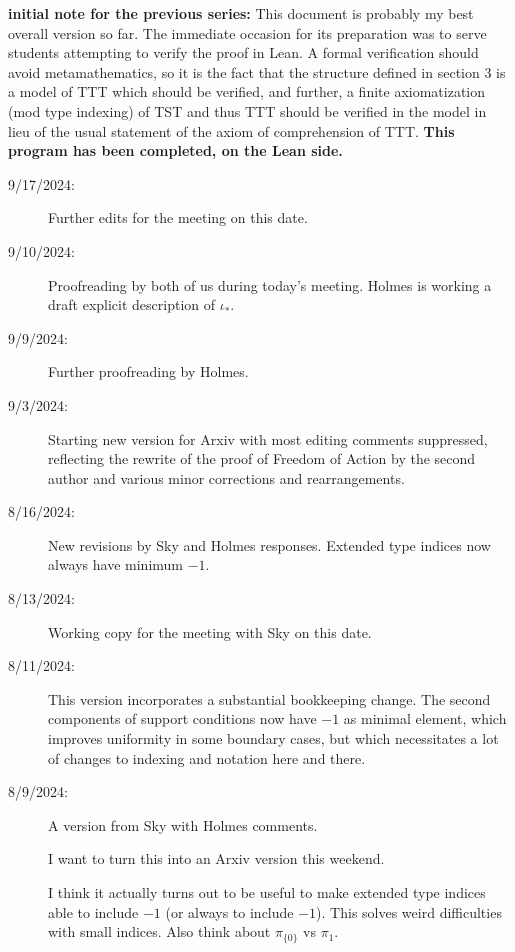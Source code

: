 \documentclass[112pt]{article}
\theoremstyle{definition}
\theoremstyle{remark}
\begin{document}
{\bf initial note for the previous series:}  This document is probably my best overall version so far.  The immediate occasion for its preparation was to serve students attempting to verify the proof in Lean.  A formal verification should avoid metamathematics, so it is the fact that the structure defined in section 3 is a model of TTT which should be verified, and further, a finite axiomatization (mod type indexing) of TST and thus TTT should be verified in the model in lieu of the usual statement of the axiom of comprehension of TTT.  {\bf This program has been completed, on the Lean side.}
\begin{description}

\item[9/17/2024:]  Further edits for the meeting on this date.

\item[9/10/2024:]  Proofreading by both of us during today's meeting.  Holmes is working a draft explicit description of $\iota_*$.

\item[9/9/2024:]  Further proofreading by Holmes.

\item[9/3/2024:]  Starting new version for Arxiv with most editing comments suppressed, reflecting the rewrite of the proof of Freedom of Action by the second author and various minor corrections and rearrangements.

\item[8/16/2024:]  New revisions by Sky and Holmes responses.  Extended type indices now always have minimum $-1$.

\item[8/13/2024:]  Working copy for the meeting with Sky on this date.

\item[8/11/2024:]  This version incorporates a substantial bookkeeping change.  The second components of support conditions now have $-1$ as minimal element, which improves uniformity in some boundary cases, but which necessitates a lot of changes to indexing and notation here and there.

\item[8/9/2024:]  A version from Sky with Holmes comments.

I want to turn this into an Arxiv version this weekend.

I think it actually turns out to be useful to make extended type indices able to include $-1$ (or always to include $-1$).
This solves weird difficulties with small indices.  Also think about $\pi_{\{0\}}$ vs $\pi_1$.


\end{description}
\end{document}
